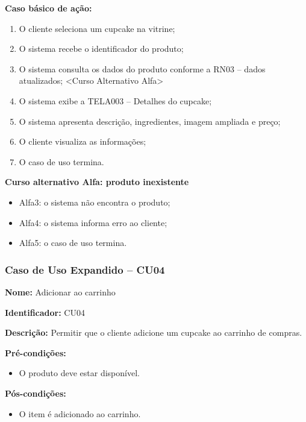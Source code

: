 \documentclass[12pt]{article}
\begin{document}
\textbf{Caso básico de ação:}
\begin{enumerate}
\item O cliente seleciona um cupcake na vitrine;
\item O sistema recebe o identificador do produto;
\item O sistema consulta os dados do produto conforme a RN03 -- dados atualizados; <Curso Alternativo Alfa>
\item O sistema exibe a TELA003 -- Detalhes do cupcake;
\item O sistema apresenta descrição, ingredientes, imagem ampliada e preço;
\item O cliente visualiza as informações;
\item O caso de uso termina.
\end{enumerate}

\textbf{Curso alternativo Alfa: produto inexistente}

\begin{itemize}
\item Alfa3: o sistema não encontra o produto;
\item Alfa4: o sistema informa erro ao cliente;
\item Alfa5: o caso de uso termina.
\end{itemize}



\subsubsection{Caso de Uso Expandido -- CU04}

\textbf{Nome:} Adicionar ao carrinho

\textbf{Identificador:} CU04

\textbf{Descrição:} Permitir que o cliente adicione um cupcake ao carrinho de compras.

\textbf{Pré-condições:}
\begin{itemize}
\item O produto deve estar disponível.
\end{itemize}

\textbf{Pós-condições:}
\begin{itemize}
\item O item é adicionado ao carrinho.
\end{itemize}
\end{document}
